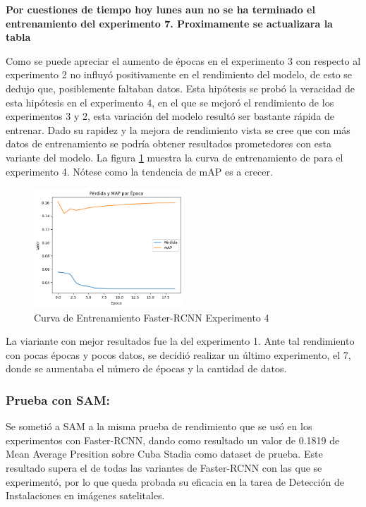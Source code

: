 \documentclass[article]{llncs}
\begin{document}
\textbf{Por cuestiones de tiempo hoy lunes aun no se ha terminado el entrenamiento del experimento 7. Proximamente se actualizara la tabla}

Como se puede apreciar el aumento de \'epocas en el experimento 3 con respecto al experimento 2 no influy\'o positivamente
en el rendimiento del modelo, de esto se dedujo que, posiblemente faltaban datos. Esta hip\'otesis se prob\'o la veracidad 
de esta hip\'otesis en el experimento 4, en el que se mejor\'o el rendimiento de los experimentos 3 y 2, esta variaci\'on del 
modelo result\'o ser bastante r\'apida de entrenar. Dado su rapidez y la mejora de rendimiento vista se cree que con m\'as datos de entrenamiento se podr\'ia obtener resultados 
prometedores con esta variante del modelo. La figura \ref{fig:mobilnetgosu} muestra la curva de entrenamiento de para el experimento 4. 
N\'otese como la tendencia de mAP es a crecer.

\begin{figure}[h]
    \centering
    \includegraphics[width=0.5\textwidth]{mobilnet_v3_large_320_fpn_20e.png}
    \caption{Curva de Entrenamiento Faster-RCNN Experimento 4}
    \label{fig:mobilnetgosu}
  \end{figure}

La viariante con mejor resultados fue la del experimento 1. Ante tal rendimiento con pocas \'epocas y pocos datos, se decidió 
realizar un \'ultimo experimento, el 7, donde se aumentaba el n\'umero de \'epocas y la cantidad de datos.

\subsubsection{Prueba con SAM:} Se someti\'o a SAM a la misma prueba de rendimiento que se us\'o en los experimentos con 
Faster-RCNN, dando como resultado un valor de 0.1819 de Mean Average Presition sobre Cuba Stadia como dataset de prueba.
Este resultado supera el de todas las variantes de Faster-RCNN con las que se experiment\'o, por lo que queda probada su eficacia 
en la tarea de Detección de Instalaciones en im\'agenes satelitales.
\end{document}
